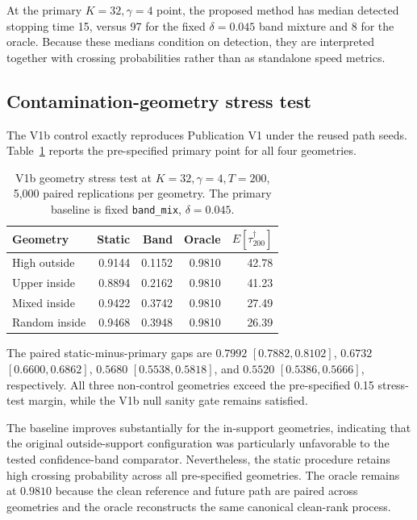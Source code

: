 At the primary \(K=32,\gamma=4\) point, the proposed method has median detected stopping time 15, versus 97 for the fixed \(\delta=0.045\) band mixture and 8 for the oracle. Because these medians condition on detection, they are interpreted together with crossing probabilities rather than as standalone speed metrics.

\subsection{Contamination-geometry stress test}

The V1b control exactly reproduces Publication V1 under the reused path seeds. Table~\ref{tab:v1b-geometry} reports the pre-specified primary point for all four geometries.

\begin{table}[ht]
\centering
\caption{V1b geometry stress test at \(K=32,\gamma=4,T=200\), 5,000 paired replications per geometry. The primary baseline is fixed \texttt{band\_mix}, \(\delta=0.045\).}
\label{tab:v1b-geometry}
\setlength{\tabcolsep}{3pt}
\begin{tabular}{lrrrr}
\toprule
Geometry & Static & Band & Oracle & \(E[\tau_{200}^\dagger]\)\\
\midrule
High outside & 0.9144 & 0.1152 & 0.9810 & 42.78\\
Upper inside & 0.8894 & 0.2162 & 0.9810 & 41.23\\
Mixed inside & 0.9422 & 0.3742 & 0.9810 & 27.49\\
Random inside & 0.9468 & 0.3948 & 0.9810 & 26.39\\
\bottomrule
\end{tabular}
\end{table}

The paired static-minus-primary gaps are \(0.7992\) \([0.7882,0.8102]\), \(0.6732\) \([0.6600,0.6862]\), \(0.5680\) \([0.5538,0.5818]\), and \(0.5520\) \([0.5386,0.5666]\), respectively. All three non-control geometries exceed the pre-specified 0.15 stress-test margin, while the V1b null sanity gate remains satisfied.

The baseline improves substantially for the in-support geometries, indicating that the original outside-support configuration was particularly unfavorable to the tested confidence-band comparator. Nevertheless, the static procedure retains high crossing probability across all pre-specified geometries. The oracle remains at \(0.9810\) because the clean reference and future path are paired across geometries and the oracle reconstructs the same canonical clean-rank process.

